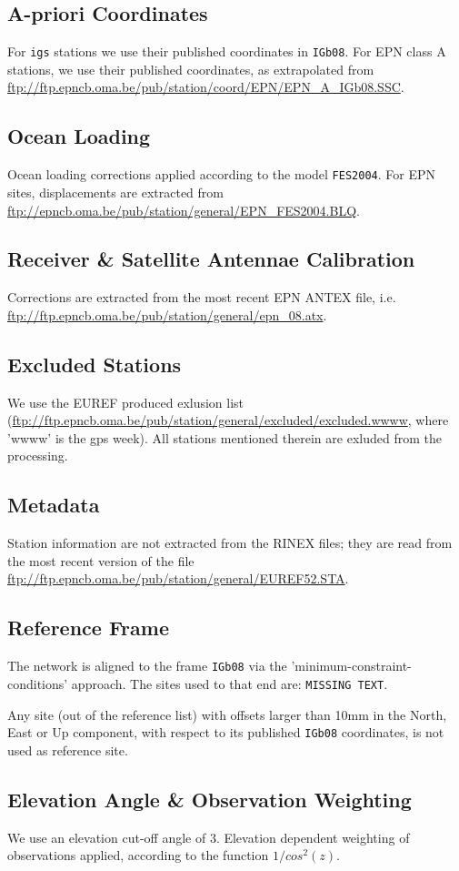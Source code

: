 \documentclass{article}
\begin{document}
\subsection{A-priori Coordinates}
For \texttt{igs} stations we use their published coordinates in \texttt{IGb08}.
For EPN class A stations, we use their published coordinates, as extrapolated
from \url{ftp://ftp.epncb.oma.be/pub/station/coord/EPN/EPN\_A\_IGb08.SSC}.
\subsection{Ocean Loading}
Ocean loading corrections applied according to the model \texttt{FES2004}. For
EPN sites, displacements are extracted from \url{ftp://epncb.oma.be/pub/station/general/EPN\_FES2004.BLQ}.
\subsection{Receiver \& Satellite Antennae Calibration}
Corrections are extracted from the most recent EPN ANTEX file, i.e. 
\url{ftp://ftp.epncb.oma.be/pub/station/general/epn\_08.atx}.
\subsection{Excluded Stations}
We use the EUREF produced exlusion list (\url{ftp://ftp.epncb.oma.be/pub/station/general/excluded/excluded.wwww}, where 'wwww' is the gps week). All stations mentioned
therein are exluded from the processing.
\subsection{Metadata}
Station information are not extracted from the RINEX files; they are read from
the most recent version of the file \url{ftp://ftp.epncb.oma.be/pub/station/general/EUREF52.STA}.
\subsection{Reference Frame}
The network is aligned to the frame \texttt{IGb08} via the 'minimum-constraint-conditions'
approach. The sites used to that end are: \texttt{MISSING TEXT}.

Any site (out of the reference list) with offsets larger than 10mm in the North,
East or Up component, with respect to its published \texttt{IGb08} coordinates, is
not used as reference site.
\subsection{Elevation Angle \& Observation Weighting}
We use an elevation cut-off angle of 3\degree. Elevation dependent weighting 
of observations applied, according to the function \(1/cos^2(z)\).
\end{document}
